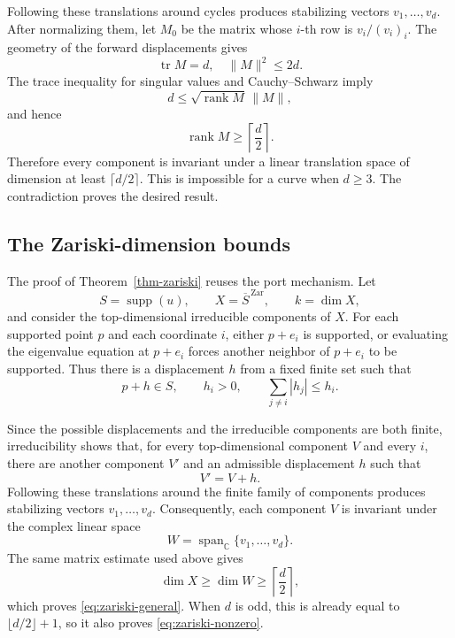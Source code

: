 \documentclass[11pt,reqno]{amsart}
\newcommand\C{\ensuremath{\mathbb{C}}}
\newcommand{\supp}{\operatorname{supp}}
\theoremstyle{definition}
\theoremstyle{plain}
\numberwithin{equation}{section}
\begin{document}
Following these translations around cycles produces stabilizing
vectors $v_1,\ldots,v_d$. After normalizing them, let $M_0$ be the
matrix whose $i$-th row is $v_i/(v_i)_i$. The geometry of the
forward displacements gives
\begin{equation*}
    \operatorname{tr}M=d,
    \quad
    \|M\|^2\leq2d.
\end{equation*}
The trace inequality for singular values and Cauchy--Schwarz imply
\begin{equation*}
    d
    \leq
    \sqrt{\operatorname{rank}M}\,
    \|M\|,
\end{equation*}
and hence
\begin{equation*}
    \operatorname{rank}M
    \geq
    \left\lceil\frac{d}{2}\right\rceil.
\end{equation*}
Therefore every component is invariant under a linear translation
space of dimension at least $\lceil d/2\rceil$. This is impossible
for a curve when $d\geq3$. The contradiction proves
the desired result.


\subsection{The Zariski-dimension bounds}
The proof of Theorem~\ref{thm-zariski} reuses the port mechanism.
Let
\begin{equation*}
    S=\supp(u),
    \qquad
    X=\overline{S}^{\,\mathrm{Zar}},
    \qquad
    k=\dim X,
\end{equation*}
and consider the top-dimensional irreducible components of $X$.
For each supported point $p$ and each coordinate $i$, either
$p+e_i$ is supported, or evaluating the eigenvalue equation at
$p+e_i$ forces another neighbor of $p+e_i$ to be supported. Thus
there is a displacement $h$ from a fixed finite set such that
\begin{equation*}
    p+h\in S,
    \qquad
    h_i>0,
    \qquad
    \sum_{j\neq i}|h_j|\leq h_i.
\end{equation*}

Since the possible displacements and the irreducible components are
both finite, irreducibility shows that, for every top-dimensional
component $V$ and every $i$, there are another component $V'$
and an admissible displacement $h$ such that
\begin{equation*}
    V'=V+h.
\end{equation*}
Following these translations around the finite family of components
produces stabilizing vectors $v_1,\ldots,v_d$. Consequently, each
component $V$ is invariant under the complex linear space
\begin{equation*}
    W=\operatorname{span}_{\C}\{v_1,\ldots,v_d\}.
\end{equation*}
The same matrix estimate used above gives
\begin{equation*}
    \dim X
    \geq
    \dim W
    \geq
    \left\lceil\frac d2\right\rceil,
\end{equation*}
which proves \eqref{eq:zariski-general}. When $d$ is odd, this is
already equal to $\lfloor d/2\rfloor+1$, so it also proves
\eqref{eq:zariski-nonzero}.
\end{document}
